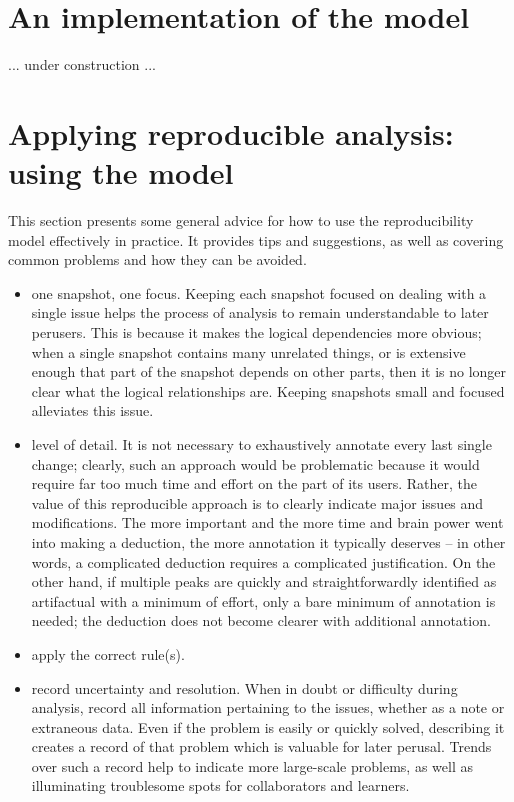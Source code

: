 

\section{An implementation of the model}
... under construction ...


\section{Applying reproducible analysis: using the model}
This section presents some general advice for how to use the reproducibility
model effectively in practice.  It provides tips and suggestions, as well
as covering common problems and how they can be avoided.

\begin{itemize}
  \item one snapshot, one focus.  Keeping each snapshot focused on dealing
    with a single issue helps the process of analysis to remain understandable
    to later perusers.  This is because it makes the logical dependencies 
    more obvious; when a single snapshot contains many unrelated things, or
    is extensive enough that part of the snapshot depends on other parts, then
    it is no longer clear what the logical relationships are.  Keeping snapshots
    small and focused alleviates this issue.
  \item level of detail.  It is not necessary to exhaustively annotate every
    last single change; clearly, such an approach would be problematic because
    it would require far too much time and effort on the part of its users.
    Rather, the value of this reproducible approach is to clearly indicate 
    major issues and modifications.  The more important and the more time and
    brain power went into making a deduction, the more annotation it typically
    deserves -- in other words, a complicated deduction requires a complicated
    justification.  On the other hand, if multiple peaks are quickly and
    straightforwardly identified as artifactual with a minimum of effort, 
    only a bare minimum of annotation is needed; the deduction does not become
    clearer with additional annotation.
  \item apply the correct rule(s).
  \item record uncertainty and resolution.  When in doubt or difficulty 
    during analysis, record all information pertaining to the issues, whether
    as a note or extraneous data.  Even if the problem is easily or quickly
    solved, describing it creates a record of that problem which is valuable
    for later perusal.  Trends over such a record help to indicate more 
    large-scale problems, as well as illuminating troublesome spots for
    collaborators and learners.
\end{itemize}
   
